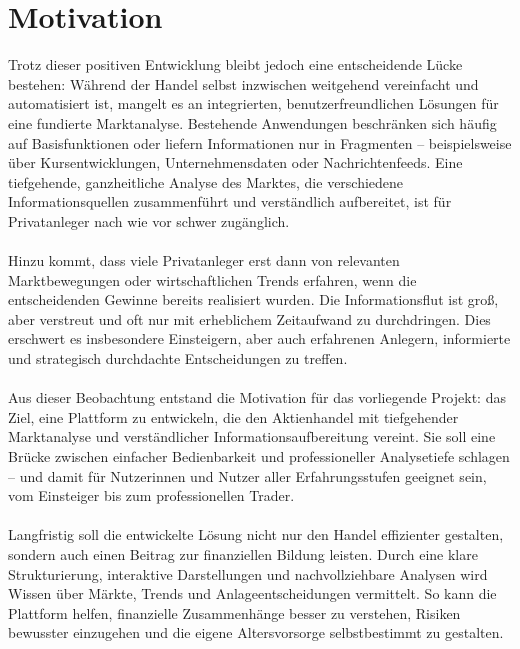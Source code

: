 \documentclass{article}
\begin{document}
\section{Motivation}
Trotz dieser positiven Entwicklung bleibt jedoch eine entscheidende Lücke bestehen: Während der Handel selbst inzwischen weitgehend vereinfacht und automatisiert ist, mangelt es an integrierten, benutzerfreundlichen Lösungen für eine fundierte Marktanalyse. Bestehende Anwendungen beschränken sich häufig auf Basisfunktionen oder liefern Informationen nur in Fragmenten – beispielsweise über Kursentwicklungen, Unternehmensdaten oder Nachrichtenfeeds. Eine tiefgehende, ganzheitliche Analyse des Marktes, die verschiedene Informationsquellen zusammenführt und verständlich aufbereitet, ist für Privatanleger nach wie vor schwer zugänglich.
\\\\
Hinzu kommt, dass viele Privatanleger erst dann von relevanten Marktbewegungen oder wirtschaftlichen Trends erfahren, wenn die entscheidenden Gewinne bereits realisiert wurden. Die Informationsflut ist groß, aber verstreut und oft nur mit erheblichem Zeitaufwand zu durchdringen. Dies erschwert es insbesondere Einsteigern, aber auch erfahrenen Anlegern, informierte und strategisch durchdachte Entscheidungen zu treffen.
\\\\
Aus dieser Beobachtung entstand die Motivation für das vorliegende Projekt: das Ziel, eine Plattform zu entwickeln, die den Aktienhandel mit tiefgehender Marktanalyse und verständlicher Informationsaufbereitung vereint. Sie soll eine Brücke zwischen einfacher Bedienbarkeit und professioneller Analysetiefe schlagen – und damit für Nutzerinnen und Nutzer aller Erfahrungsstufen geeignet sein, vom Einsteiger bis zum professionellen Trader.
\\\\
Langfristig soll die entwickelte Lösung nicht nur den Handel effizienter gestalten, sondern auch einen Beitrag zur finanziellen Bildung leisten. Durch eine klare Strukturierung, interaktive Darstellungen und nachvollziehbare Analysen wird Wissen über Märkte, Trends und Anlageentscheidungen vermittelt. So kann die Plattform helfen, finanzielle Zusammenhänge besser zu verstehen, Risiken bewusster einzugehen und die eigene Altersvorsorge selbstbestimmt zu gestalten.
\end{document}

